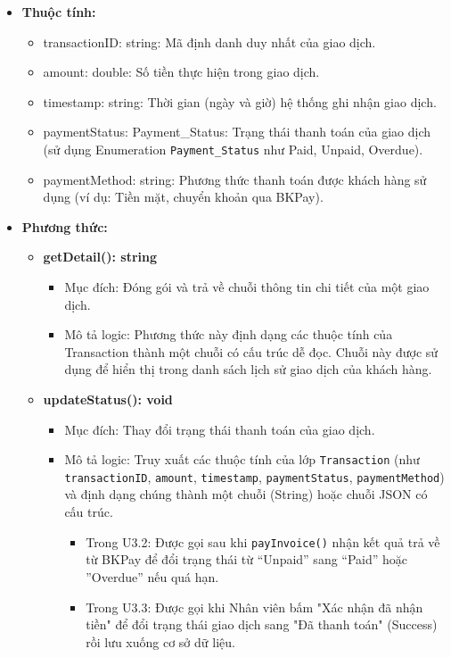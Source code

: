 \begin{itemize}
    \item \textbf{Thuộc tính:}
    \begin{itemize}
        \item transactionID: string: Mã định danh duy nhất của giao dịch.
        \item amount: double: Số tiền thực hiện trong giao dịch.
        \item timestamp: string: Thời gian (ngày và giờ) hệ thống ghi nhận giao dịch.
        \item paymentStatus: Payment\_Status: Trạng thái thanh toán của giao dịch (sử dụng Enumeration \texttt{Payment\_Status} như Paid, Unpaid, Overdue).
        \item paymentMethod: string: Phương thức thanh toán được khách hàng sử dụng (ví dụ: Tiền mặt, chuyển khoản qua BKPay).
    \end{itemize}

    \item \textbf{Phương thức:}
    \begin{itemize}
        \item \textbf{getDetail(): string}
        \begin{itemize}
            \item Mục đích: Đóng gói và trả về chuỗi thông tin chi tiết của một giao dịch.
            \item Mô tả logic: Phương thức này định dạng các thuộc tính của Transaction thành một chuỗi có cấu trúc dễ đọc. Chuỗi này được sử dụng để hiển thị trong danh sách lịch sử giao dịch của khách hàng.
        \end{itemize}

        \item \textbf{updateStatus(): void}
        \begin{itemize}
            \item Mục đích: Thay đổi trạng thái thanh toán của giao dịch.

            \item Mô tả logic: Truy xuất các thuộc tính của lớp \texttt{Transaction} (như \texttt{transactionID}, \texttt{amount}, \texttt{timestamp}, \texttt{paymentStatus}, \texttt{paymentMethod}) và định dạng chúng thành một chuỗi (String) hoặc chuỗi JSON có cấu trúc.
            \begin{itemize}
                \item Trong U3.2: Được gọi sau khi \texttt{payInvoice()} nhận kết quả trả về từ BKPay để đổi trạng thái từ ``Unpaid'' sang ``Paid'' hoặc ''Overdue'' nếu quá hạn.
                \item Trong U3.3: Được gọi khi Nhân viên bấm "Xác nhận đã nhận tiền" để đổi trạng thái giao dịch sang "Đã thanh toán" (Success) rồi lưu xuống cơ sở dữ liệu.
            \end{itemize}
        \end{itemize}
    \end{itemize}
\end{itemize}

